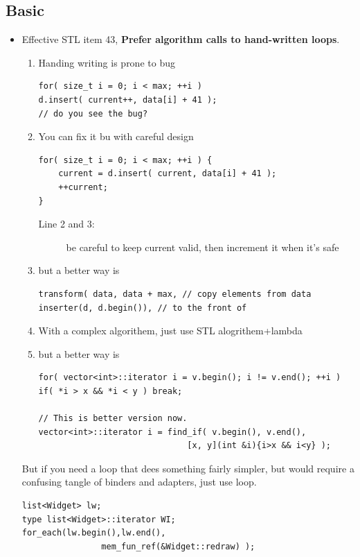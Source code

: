 \documentclass[a4paper,11pt,twoside]{book}
\begin{document}
\subsection{Basic}

\begin{itemize}

\item Effective STL item 43, \textbf{Prefer algorithm calls to hand-written loops}.
\begin{enumerate}
\item  Handing writing is prone to bug

\begin{lstlisting}[numbers=none]
for( size_t i = 0; i < max; ++i )
d.insert( current++, data[i] + 41 ); 
// do you see the bug?
\end{lstlisting}
\item You can fix it bu with careful design
\begin{lstlisting}
for( size_t i = 0; i < max; ++i ) {
	current = d.insert( current, data[i] + 41 ); 
	++current;    
}
\end{lstlisting}
\begin{description}
	\item[Line 2 and 3:] be careful to keep current valid, then increment it when it's safe
\end{description}
\item but a better way is
\begin{lstlisting}[numbers=none]
transform( data, data + max, // copy elements from data
inserter(d, d.begin()), // to the front of
\end{lstlisting}

\item With a complex algorithem, just use STL alogrithem+lambda
\item but a better way is
\begin{lstlisting}[numbers=none]
for( vector<int>::iterator i = v.begin(); i != v.end(); ++i )
if( *i > x && *i < y ) break;

// This is better version now.
vector<int>::iterator i = find_if( v.begin(), v.end(),
                              [x, y](int &i){i>x && i<y} );
\end{lstlisting}



\end{enumerate}
But if you need a loop that dees something fairly simpler, but would require a confusing tangle of binders and adapters, just use loop.
\begin{lstlisting}[numbers=none]
list<Widget> lw;
type list<Widget>::iterator WI;
for_each(lw.begin(),lw.end(),
                mem_fun_ref(&Widget::redraw) );


\end{lstlisting}
\end{itemize}
\end{document}
